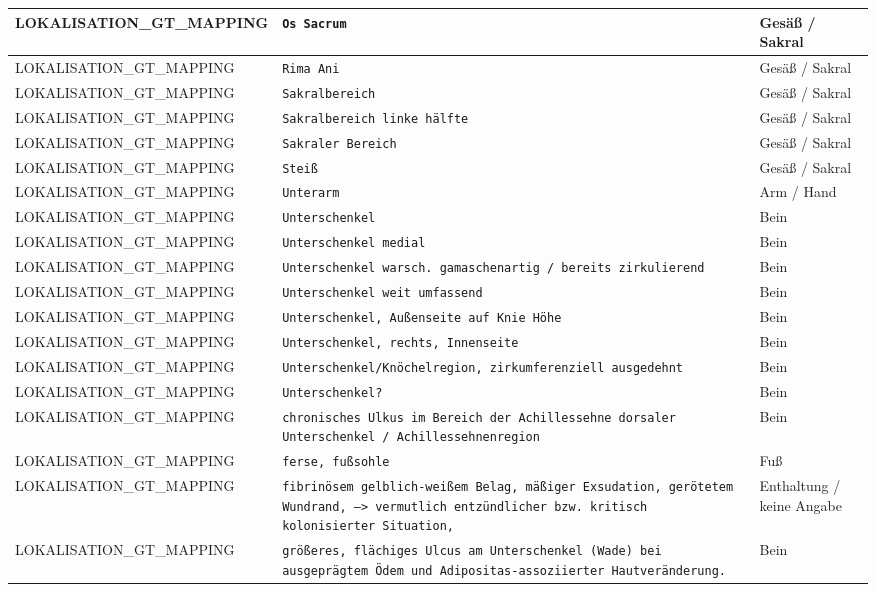\begin{longtable}{|p{3.5cm}|p{5cm}|p{6.5cm}|}
LOKALISATION\_GT\_MAPPING & \texttt{Os Sacrum} & Gesäß / Sakral \\ \hline
LOKALISATION\_GT\_MAPPING & \texttt{Rima Ani} & Gesäß / Sakral \\ \hline
LOKALISATION\_GT\_MAPPING & \texttt{Sakralbereich} & Gesäß / Sakral \\ \hline
LOKALISATION\_GT\_MAPPING & \texttt{Sakralbereich linke hälfte} & Gesäß / Sakral \\ \hline
LOKALISATION\_GT\_MAPPING & \texttt{Sakraler Bereich} & Gesäß / Sakral \\ \hline
LOKALISATION\_GT\_MAPPING & \texttt{Steiß} & Gesäß / Sakral \\ \hline
LOKALISATION\_GT\_MAPPING & \texttt{Unterarm} & Arm / Hand \\ \hline
LOKALISATION\_GT\_MAPPING & \texttt{Unterschenkel} & Bein \\ \hline
LOKALISATION\_GT\_MAPPING & \texttt{Unterschenkel  medial} & Bein \\ \hline
LOKALISATION\_GT\_MAPPING & \texttt{Unterschenkel warsch. gamaschenartig / bereits zirkulierend} & Bein \\ \hline
LOKALISATION\_GT\_MAPPING & \texttt{Unterschenkel weit umfassend} & Bein \\ \hline
LOKALISATION\_GT\_MAPPING & \texttt{Unterschenkel, Außenseite auf Knie Höhe} & Bein \\ \hline
LOKALISATION\_GT\_MAPPING & \texttt{Unterschenkel, rechts, Innenseite} & Bein \\ \hline
LOKALISATION\_GT\_MAPPING & \texttt{Unterschenkel/Knöchelregion, zirkumferenziell ausgedehnt} & Bein \\ \hline
LOKALISATION\_GT\_MAPPING & \texttt{Unterschenkel?} & Bein \\ \hline
LOKALISATION\_GT\_MAPPING & \texttt{chronisches Ulkus im Bereich der Achillessehne
dorsaler Unterschenkel / Achillessehnenregion} & Bein \\ \hline
LOKALISATION\_GT\_MAPPING & \texttt{ferse, fußsohle} & Fuß \\ \hline
LOKALISATION\_GT\_MAPPING & \texttt{fibrinösem gelblich-weißem Belag,
mäßiger Exsudation,
gerötetem Wundrand,
--> vermutlich entzündlicher bzw. kritisch kolonisierter Situation,} & Enthaltung / keine Angabe \\ \hline
LOKALISATION\_GT\_MAPPING & \texttt{größeres, flächiges Ulcus am Unterschenkel (Wade) bei ausgeprägtem Ödem und Adipositas-assoziierter Hautveränderung.} & Bein \\ \hline

\end{longtable}
